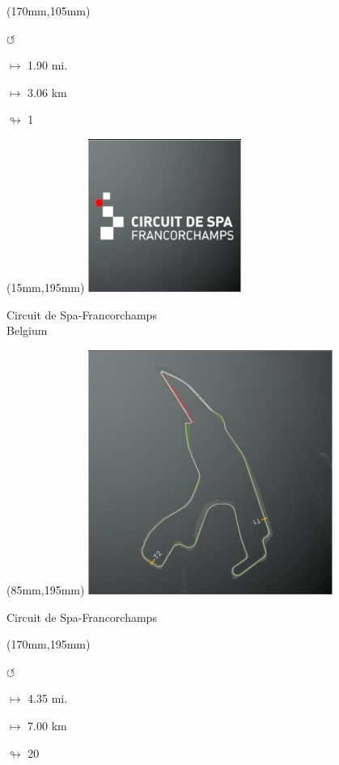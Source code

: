 \begin{textblock*}{30mm}(170mm,105mm)%
\par \Huge$\circlearrowleft$
\Large
\par$\mapsto$ 1.90 mi.
\par$\mapsto$ 3.06 km
\par$\looparrowright$ 1
\end{textblock*}
\begin{textblock*}{60mm}(15mm,195mm)%
\includegraphics[width=50mm]{LG/2015-05-20_00079.png}
\par Circuit de Spa-Francorchamps\\ Belgium
\end{textblock*}
\begin{textblock*}{80mm}(85mm,195mm)%
\includegraphics[width=80mm]{TR/2015-05-20_00021.png}
\centerline{Circuit de Spa-Francorchamps}
\end{textblock*}
\begin{textblock*}{30mm}(170mm,195mm)%
\par \Huge$\circlearrowleft$
\Large
\par$\mapsto$ 4.35 mi.
\par$\mapsto$ 7.00 km
\par$\looparrowright$ 20
\end{textblock*}
\null\newpage

